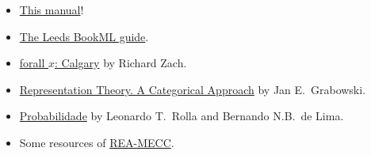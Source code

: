\documentclass[a4paper,british]{article}
\begin{document}
\begin{itemize}
  \item \href{https://vlmantova.github.io/bookml/}{This manual}!
  \item \href{https://vlmantova.github.io/bookmlleeds/}{The Leeds BookML guide}.
  \item \href{https://forallx.openlogicproject.org/html/}{forall $x$: Calgary} by Richard Zach.
  \item \href{https://www.maths.lancs.ac.uk/~grabowsj/rtaca/}{Representation Theory. A Categorical Approach} by Jan E.\ Grabowski.
  \item \href{https://www.ime.usp.br/~leorolla/probabilidade/}{Probabilidade} by Leonardo T.\ Rolla and Bernando N.B.\ de Lima.
  \item Some resources of \href{https://rea-mecc.github.io/acervo.html}{REA-MECC}.
\end{itemize}
\end{document}
